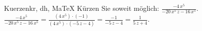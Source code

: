 \begin{MAufgabe}{Kuerzen}{kr, dh, MaTeX}
K\"urzen Sie soweit m\"oglich: $\frac{- 4\, x^5}{ - 20\, x^5\, z - 16\, x^5}$.\\ 
\ifLsg\MLoesung
\quad $\frac{- 4\, x^5}{ - 20\, x^5\, z - 16\, x^5}=\frac{(4\, x^5)\cdot(-1)}{(4\, x^5)\cdot( - 5\, z - 4)}=\frac{-1}{ - 5\, z - 4}=\frac{1}{5\, z + 4}$.\else\relax\fi
 \end{MAufgabe}